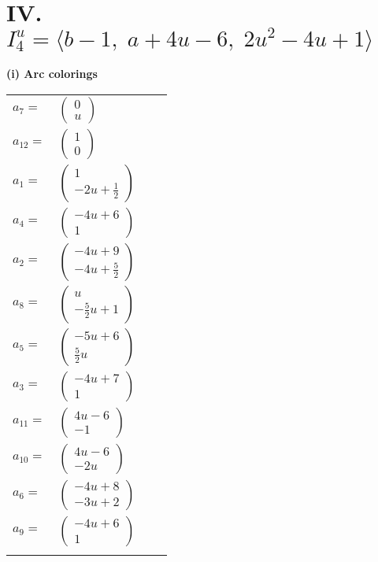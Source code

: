 \documentclass[1p]{elsarticle_modified}
\theoremstyle{definition}
\begin{document}
\centering \section*{IV. $I^u_{4}= \langle b-1,\;a+4 u-6,\;2 u^2-4 u+1 \rangle$}
\flushleft \textbf{(i) Arc colorings}\\
\begin{tabular}{m{7pt} m{180pt} m{7pt} m{180pt} }
\flushright $a_{7}=$&$\begin{pmatrix}0\\u\end{pmatrix}$ \\
\flushright $a_{12}=$&$\begin{pmatrix}1\\0\end{pmatrix}$ \\
\flushright $a_{1}=$&$\begin{pmatrix}1\\-2 u+\frac{1}{2}\end{pmatrix}$ \\
\flushright $a_{4}=$&$\begin{pmatrix}-4 u+6\\1\end{pmatrix}$ \\
\flushright $a_{2}=$&$\begin{pmatrix}-4 u+9\\-4 u+\frac{5}{2}\end{pmatrix}$ \\
\flushright $a_{8}=$&$\begin{pmatrix}u\\-\frac{5}{2} u+1\end{pmatrix}$ \\
\flushright $a_{5}=$&$\begin{pmatrix}-5 u+6\\\frac{5}{2} u\end{pmatrix}$ \\
\flushright $a_{3}=$&$\begin{pmatrix}-4 u+7\\1\end{pmatrix}$ \\
\flushright $a_{11}=$&$\begin{pmatrix}4 u-6\\-1\end{pmatrix}$ \\
\flushright $a_{10}=$&$\begin{pmatrix}4 u-6\\-2 u\end{pmatrix}$ \\
\flushright $a_{6}=$&$\begin{pmatrix}-4 u+8\\-3 u+2\end{pmatrix}$ \\
\flushright $a_{9}=$&$\begin{pmatrix}-4 u+6\\1\end{pmatrix}$\\&\end{tabular}
\end{document}
